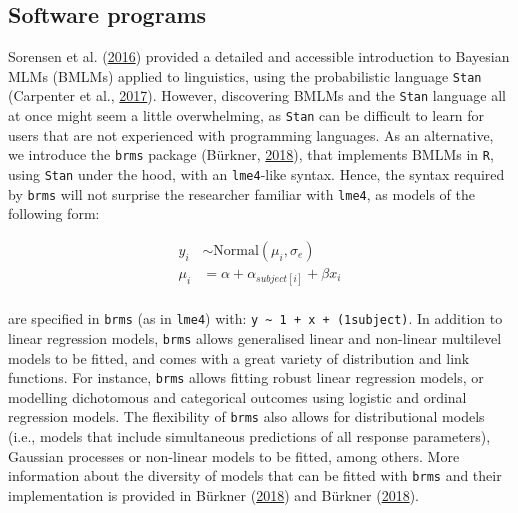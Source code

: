 \documentclass[a4paper,12pt,twoside,openright,oldfontcommands,final]{memoir}
\begin{document}
\hypertarget{software-programs}{%
\subsection{Software programs}\label{software-programs}}

Sorensen et al. (\protect\hyperlink{ref-sorensen_bayesian_2016}{2016}) provided a detailed and accessible introduction to Bayesian MLMs (BMLMs) applied to linguistics, using the probabilistic language \texttt{Stan} (Carpenter et al., \protect\hyperlink{ref-carpenter_stan_2017}{2017}). However, discovering BMLMs and the \texttt{Stan} language all at once might seem a little overwhelming, as \texttt{Stan} can be difficult to learn for users that are not experienced with programming languages. As an alternative, we introduce the \texttt{brms} package (Bürkner, \protect\hyperlink{ref-R-brms}{2018}), that implements BMLMs in \texttt{R}, using \texttt{Stan} under the hood, with an \texttt{lme4}-like syntax. Hence, the syntax required by \texttt{brms} will not surprise the researcher familiar with \texttt{lme4}, as models of the following form:

\[
\begin{aligned}
y_{i} &\sim \mathrm{Normal}(\mu_{i}, \sigma_{e}) \\
\mu_{i} &= \alpha + \alpha_{subject[i]} + \beta x_{i} \\
\end{aligned}
\]

\vspace{5mm}

are specified in \texttt{brms} (as in \texttt{lme4}) with: \texttt{y\ \textasciitilde{}\ 1\ +\ x\ +\ (1\textbar{}subject)}. In addition to linear regression models, \texttt{brms} allows generalised linear and non-linear multilevel models to be fitted, and comes with a great variety of distribution and link functions. For instance, \texttt{brms} allows fitting robust linear regression models, or modelling dichotomous and categorical outcomes using logistic and ordinal regression models. The flexibility of \texttt{brms} also allows for distributional models (i.e., models that include simultaneous predictions of all response parameters), Gaussian processes or non-linear models to be fitted, among others. More information about the diversity of models that can be fitted with \texttt{brms} and their implementation is provided in Bürkner (\protect\hyperlink{ref-R-brms}{2018}) and Bürkner (\protect\hyperlink{ref-burkner_advanced_2018}{2018}).
\end{document}
